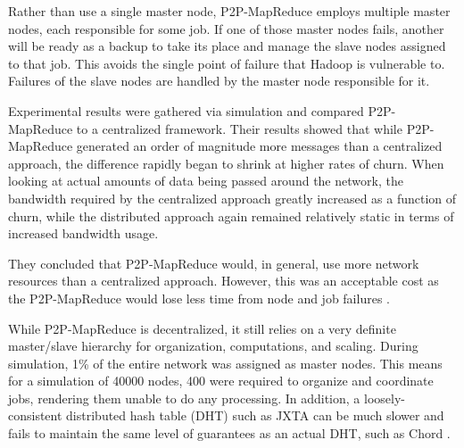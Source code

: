 \documentclass[10pt, conference, compsocconf]{IEEEtran}
\begin{document}
Rather than use a single master node, P2P-MapReduce employs multiple master nodes, each responsible for some job.  If one of those master nodes fails, another will be ready as a backup to take its place and manage the slave nodes assigned to that job.  This avoids the single point of failure that Hadoop is vulnerable to. Failures of the slave nodes are handled by the master node responsible for it.

Experimental results were gathered via simulation and compared P2P-MapReduce to a centralized framework. Their results showed that while P2P-MapReduce generated an order of magnitude more messages than a centralized approach, the difference rapidly began to shrink at higher rates of churn.  When looking at actual amounts of data being passed around the network, the bandwidth required by the centralized approach greatly increased as a function of churn, while the distributed approach again remained relatively static in terms of increased bandwidth usage.  

They concluded that P2P-MapReduce would, in general, use more network resources than a centralized approach. However, this was an acceptable cost as the P2P-MapReduce would lose less time from node and job failures \cite{marozzo2012p2p}.

While P2P-MapReduce is decentralized, it still relies on a very definite master/slave hierarchy for organization, computations, and scaling. 
During simulation, 1\% of the entire network was assigned as master nodes. This means for a simulation of 40000 nodes, 400 were required to organize and coordinate jobs, rendering them unable to do any processing.  In addition, a loosely-consistent  distributed hash table (DHT) such as JXTA can be much slower and fails to maintain the same level of guarantees as an actual DHT, such as Chord \cite{5359174}.   


\end{document}
